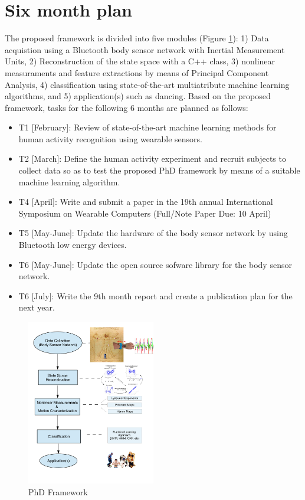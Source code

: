 \documentclass{sigchi}
\begin{document}
\section{Six month plan}
The proposed framework is divided into five modules (Figure \ref{fig:proposedapproach}): 
1) Data acquistion using a Bluetooth body sensor network with Inertial Measurement Units, 
2) Reconstruction of the state space with a C++ class, 
3) nonlinear measuraments and feature extractions by means of Principal Component
Analysis, 
4) classification using state-of-the-art multiatribute machine learning algorithms, 
and  5) application(s) such as dancing. 
Based on the proposed framework, 
tasks for the following 6 months are planned as follows:
\begin{itemize}
\item T1 [February]: Review of state-of-the-art machine learning methods 
for human activity recognition using wearable sensors.
\item T2 [March]: Define the human activity experiment and recruit subjects 
to collect data so as to test the proposed PhD framework by means of a suitable
machine learning algorithm.
\item T4 [April]: Write and submit a paper in the 19th annual International Symposium
on Wearable Computers (Full/Note Paper Due: 10 April)
\item T5 [May-June]: Update the hardware of the body sensor network by using
Bluetooth low energy devices.  
\item T6 [May-June]: Update the open source sofware library for the body sensor
network.
\item T6 [July]: Write the 9th month report and create a publication
plan for the next year.
\end{itemize}

\begin{figure}[htbp!] 
\centering    
\includegraphics[width=0.5\textwidth]{proposedapproach_v1}
\caption[PA]{PhD Framework}
\label{fig:proposedapproach}
\end{figure}
\end{document}
